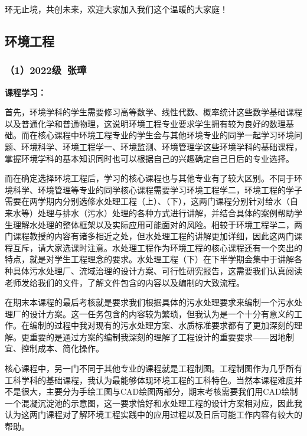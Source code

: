 \documentclass[11pt,oneside]{book}
\begin{document}
\vspace{10pt}

环无止境，共创未来，欢迎大家加入我们这个温暖的大家庭！

\subsection{环境工程}

\subsubsection{（1）2022级\ 张璋}
\textbf{课程学习：}

首先，环境学科的学生需要修习高等数学、线性代数、概率统计这些数学基础课程以及普通化学和普通物理，这说明环境工程专业要求学生拥有较为良好的数理基础。而在核心课程中环境工程专业的学生会与其他环境专业的同学一起学习环境问题、环境科学、环境工程学一、环境监测、环境管理学这些环境学科的基础课程，掌握环境学科的基本知识同时也可以根据自己的兴趣确定自己日后的专业选择。

\vspace{10pt}

而在确定选择环境工程后，学习的核心课程也与其他专业有了较大区别。不同于环境科学、环境管理等专业的同学核心课程需要学习环境工程学二，环境工程的学子需要在两学期内分别选修水处理工程（上）、（下），这两门课程分别针对给水（自来水等）处理与排水（污水）处理的各种方式进行讲解，并结合具体的案例帮助学生理解水处理的整体框架以及实际应用可能面对的风险。相较于环境工程学二，两门课程教授的内容有诸多相近之处，但水处理工程的讲解更加详细，因此这两门课程互斥，请大家选课时注意。水处理工程作为环境工程的核心课程还有一个突出的特点，就是对学生工程理念的要求。水处理工程（下）在下半学期会集中于讲解各种具体污水处理厂、流域治理的设计方案、可行性研究报告，这需要我们认真阅读老师发给我们的文件，了解文件包含的内容以及编制的大致流程。

\vspace{10pt}

在期末本课程的最后考核就是要求我们根据具体的污水处理要求来编制一个污水处理厂的设计方案。这一任务包含的内容较为繁琐，但我认为是一个十分有意义的工作。在编制的过程中我对现有的污水处理方案、水质标准要求都有了更加深刻的理解。更重要的是通过方案的编制我深刻的理解了工程设计的重要要求——因地制宜、控制成本、简化操作。

\vspace{10pt}

核心课程中，另一门不同于其他专业的课程就是工程制图。工程制图作为几乎所有工科学科的基础课程，我认为最能够体现环境工程的工科特色。当然本课程难度并不是很大，主要分为手绘工图与CAD绘图两部分，期末考核需要我们用CAD绘制一个混凝沉淀池的示意图，这一要求恰好和水处理工程的设计方案相对应，因此我认为这两门课程对了解环境工程实践中的应用过程以及日后可能工作内容有较大的帮助。
\end{document}
